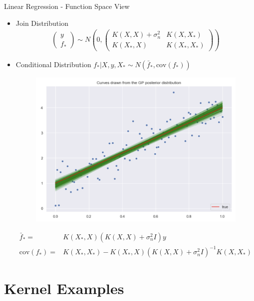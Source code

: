 \documentclass[10pt]{beamer}
\begin{document}
\begin{frame}{Linear Regression - Function Space View}{\cite[Chapter 2.2]{RW05}}
\begin{itemize}
\item Join Distribution
\begin{align*}
\left(
\begin{array}{c}
y \\
f_*
\end{array}
\right)
\sim
N\left(0, 
\left(
\begin{array}{cc}
K(X,X)+\sigma_n^2 & K(X,X_*) \\
K(X_*,X) & K(X_*,X_*)
\end{array}
\right)
\right)
\end{align*}
\item Conditional Distribution $f_* | X, y, X_*\sim N(\bar{f}_*, \text{cov}(f_*))$
\begin{center}
\begin{figure}
\includegraphics[scale=0.15]{images/gp_lin_posterior.png} 
\end{figure}
\end{center}
\begin{align*}
\bar{f}_* =& K(X_*,X)(K(X,X) + \sigma_n^2 I)y \\
 \text{cov}(f_*) =& K(X_*,X_*) - K(X_*,X)(K(X,X) + \sigma_n^2I)^{-1}K(X,X_*)
\end{align*}
\end{itemize}
\end{frame}


\section{Kernel Examples}
\end{document}
